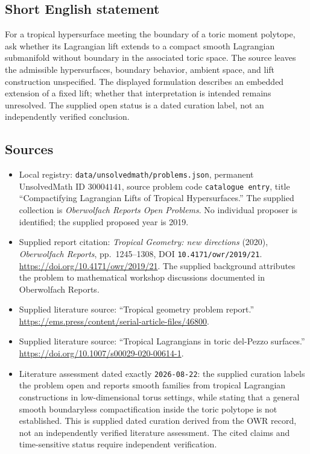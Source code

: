 \documentclass[11pt]{article}
\begin{document}
\subsection{Short English statement}
For a tropical hypersurface meeting the boundary of a toric moment polytope, ask whether its Lagrangian lift extends to a compact smooth Lagrangian submanifold without boundary in the associated toric space. The source leaves the admissible hypersurfaces, boundary behavior, ambient space, and lift construction unspecified. The displayed formulation describes an embedded extension of a fixed lift; whether that interpretation is intended remains unresolved. The supplied open status is a dated curation label, not an independently verified conclusion.
\subsection{Sources}
\begin{itemize}
\item Local registry: \texttt{data/unsolvedmath/problems.json}, permanent UnsolvedMath ID \(30004141\), source problem code \texttt{catalogue entry}, title ``Compactifying Lagrangian Lifts of Tropical Hypersurfaces.'' The supplied collection is \emph{Oberwolfach Reports Open Problems}. No individual proposer is identified; the supplied proposed year is 2019.
\item Supplied report citation: \emph{Tropical Geometry: new directions} (2020), \emph{Oberwolfach Reports}, pp.~1245--1308, DOI \texttt{10.4171/owr/2019/21}. \url{https://doi.org/10.4171/owr/2019/21}. The supplied background attributes the problem to mathematical workshop discussions documented in Oberwolfach Reports.
\item Supplied literature source: ``Tropical geometry problem report.'' \url{https://ems.press/content/serial-article-files/46800}.
\item Supplied literature source: ``Tropical Lagrangians in toric del-Pezzo surfaces.'' \url{https://doi.org/10.1007/s00029-020-00614-1}.
\item Literature assessment dated exactly \texttt{2026-08-22}: the supplied curation labels the problem open and reports smooth families from tropical Lagrangian constructions in low-dimensional torus settings, while stating that a general smooth boundaryless compactification inside the toric polytope is not established. This is supplied dated curation derived from the OWR record, not an independently verified literature assessment. The cited claims and time-sensitive status require independent verification.
\end{itemize}
\end{document}
